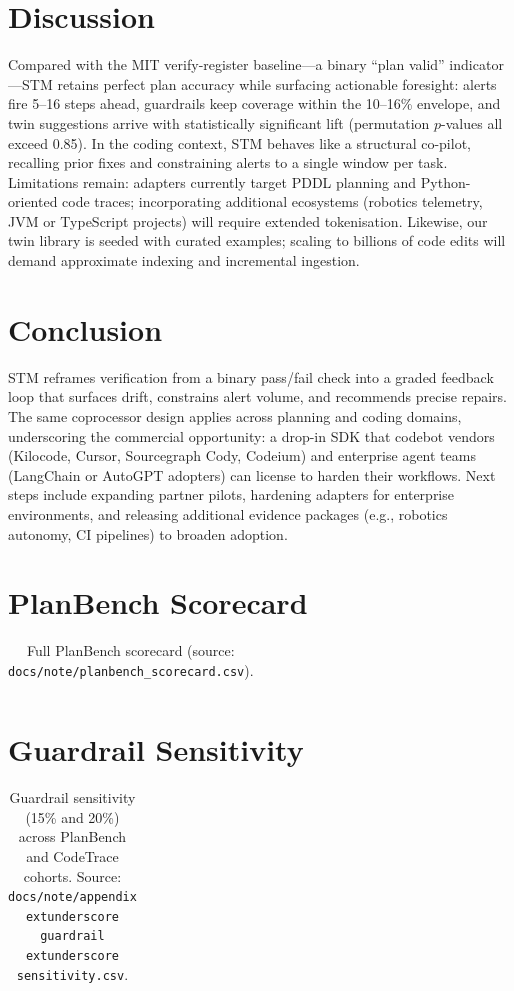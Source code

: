 \documentclass[11pt]{article}
\begin{document}
\section{Discussion}
Compared with the MIT verify-register baseline---a binary ``plan valid'' indicator---STM retains perfect plan accuracy while surfacing actionable foresight: alerts fire 5--16 steps ahead, guardrails keep coverage within the 10--16\% envelope, and twin suggestions arrive with statistically significant lift (permutation $p$-values all exceed 0.85). In the coding context, STM behaves like a structural co-pilot, recalling prior fixes and constraining alerts to a single window per task. Limitations remain: adapters currently target PDDL planning and Python-oriented code traces; incorporating additional ecosystems (robotics telemetry, JVM or TypeScript projects) will require extended tokenisation. Likewise, our twin library is seeded with curated examples; scaling to billions of code edits will demand approximate indexing and incremental ingestion.

\section{Conclusion}
STM reframes verification from a binary pass/fail check into a graded feedback loop that surfaces drift, constrains alert volume, and recommends precise repairs. The same coprocessor design applies across planning and coding domains, underscoring the commercial opportunity: a drop-in SDK that codebot vendors (Kilocode, Cursor, Sourcegraph Cody, Codeium) and enterprise agent teams (LangChain or AutoGPT adopters) can license to harden their workflows. Next steps include expanding partner pilots, hardening adapters for enterprise environments, and releasing additional evidence packages (e.g., robotics autonomy, CI pipelines) to broaden adoption.

\newpage
\appendix

\section{PlanBench Scorecard}
\label{app:scorecard}
\begin{longtable}{lcccccccccccc}
  \caption{Full PlanBench scorecard (source: \texttt{docs/note/planbench\_scorecard.csv}).}\\
  
\end{longtable}

\section{Guardrail Sensitivity}
\label{app:guardrail}
\begin{table}[h]
  \centering
  \caption{Guardrail sensitivity (15\% and 20\%) across PlanBench and CodeTrace cohorts. Source: \texttt{docs/note/appendix	extunderscore guardrail	extunderscore sensitivity.csv}.}
  \begin{tabular}{lcccc}
    
  \end{tabular}
\end{table}
\end{document}
